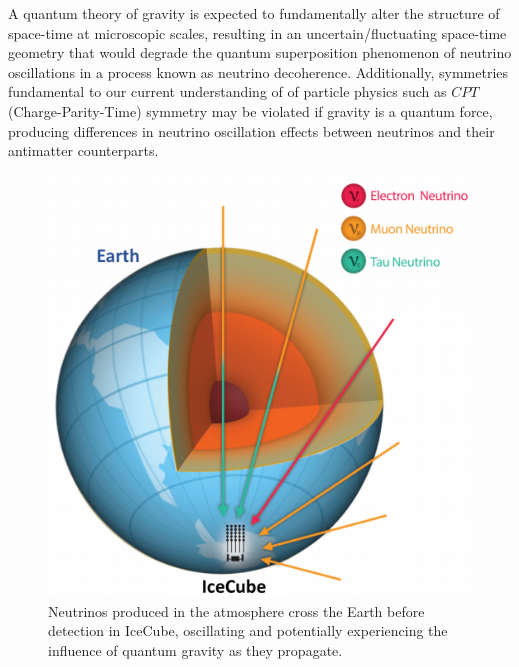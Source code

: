 \documentclass[a4paper,11pt]{article}
\begin{document}
A quantum theory of gravity is expected to fundamentally alter the structure of space-time at microscopic scales, resulting in an uncertain/fluctuating space-time geometry that would degrade the quantum superposition phenomenon of neutrino oscillations in a process known as neutrino decoherence. Additionally, symmetries fundamental to our current understanding of of particle physics such as $CPT$ (Charge-Parity-Time) symmetry may be violated if gravity is a quantum force, producing differences in neutrino oscillation effects between neutrinos and their antimatter counterparts. 

\begin{figure} %
    \centering
		\includegraphics[width=1.\linewidth]{images/atmo_osc.png}
		\caption{Neutrinos produced in the atmosphere cross the Earth before detection in IceCube, oscillating and potentially experiencing the influence of quantum gravity as they propagate.}
		\vspace{-7pt}
		\label{fig:atmo_osc}
\end{figure}
\end{document}
